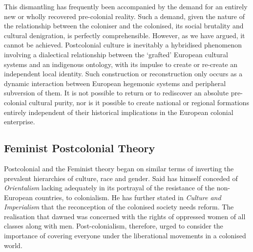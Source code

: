 This dismantling has frequently been accompanied by the demand for an entirely new or wholly recovered pre-colonial reality. Such a demand, given the nature of the relationship between the coloniser and the colonised, its social brutality and cultural denigration, is perfectly comprehensible. However, as we have argued, it cannot be achieved. Postcolonial culture is inevitably a hybridised phenomenon involving a dialectical relationship between the `grafted' European cultural systems and an indigenous ontology, with its impulse to create or re-create an independent local identity. Such construction or reconstruction only occurs as a dynamic interaction between European hegemonic systems and peripheral subversion of them. It is not possible to return or to rediscover an absolute pre-colonial cultural purity, nor is it possible to create national or regional formations entirely independent of their historical implications in the European colonial enterprise. \parencite[p.~195-96]{Griffiths1989}

\subsection{Feminist Postcolonial Theory}

Postcolonial and the Feminist theory began on similar terms of inverting the prevalent hierarchies of culture, race and gender. Said has himself conceded of \emph{Orientalism} lacking adequately in its portrayal of the resistance of the non-European countries, to colonialism. He has further stated in \emph{Culture and Imperialism }that the reconception of the colonised society needs reform. The realisation that dawned was concerned with the rights of oppressed women of all classes along with men. Post-colonialism, therefore, urged to consider the importance of covering everyone under the liberational movements in a colonised world.

